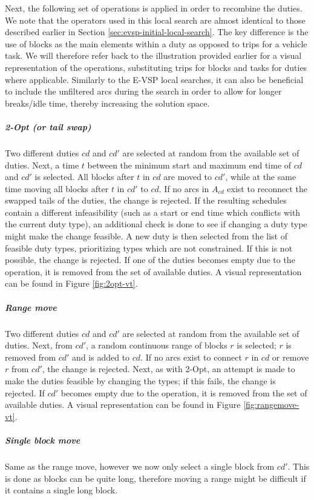 \documentclass[]{article}
\begin{document}
Next, the following set of operations is applied in order to recombine the duties. We note that the operators used in this local search are almost identical to those described earlier in Section \ref{sec:evsp-initial-local-search}. The key difference is the use of blocks as the main elements within a duty as opposed to trips for a vehicle task. We will therefore refer back to the illustration provided earlier for a visual representation of the operations, substituting trips for blocks and tasks for duties where applicable. Similarly to the E-VSP local searches, it can also be beneficial to include the unfiltered arcs during the search in order to allow for longer breaks/idle time, thereby increasing the solution space.

\noindent\subparagraph{2-Opt (or tail swap)} Two different duties $cd$ and $cd'$ are selected at random from the available set of duties. Next, a time $t$ between the minimum start and maximum end time of $cd$ and $cd'$ is selected. All blocks after $t$ in $cd$ are moved to $cd'$, while at the same time moving all blocks after $t$ in $cd'$ to $cd$. If no arcs in $A_{cd}$ exist to reconnect the swapped tails of the duties, the change is rejected. If the resulting schedules contain a different infeasibility (such as a start or end time which conflicts with the current duty type), an additional check is done to see if changing a duty type might make the change feasible. A new duty is then selected from the list of feasible duty types, prioritizing types which are not constrained. If this is not possible, the change is rejected. If one of the duties becomes empty due to the operation, it is removed from the set of available duties. A visual representation can be found in Figure \ref{fig:2opt-vt}.
\noindent\subparagraph{Range move} Two different duties $cd$ and $cd'$ are selected at random from the available set of duties. Next, from $cd'$, a random continuous range of blocks $r$ is selected; $r$ is removed from $cd'$ and is added to $cd$. If no arcs exist to connect $r$ in $cd$ or remove $r$ from $cd'$, the change is rejected. Next, as with 2-Opt, an attempt is made to make the duties feasible by changing the types; if this fails, the change is rejected. If $cd'$ becomes empty due to the operation, it is removed from the set of available duties. A visual representation can be found in Figure \ref{fig:rangemove-vt}.
\noindent\subparagraph{Single block move} Same as the range move, however we now only select a single block from $cd'$. This is done as blocks can be quite long, therefore moving a range might be difficult if it contains a single long block. \\
\end{document}
